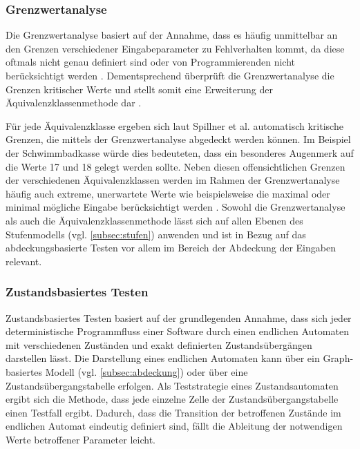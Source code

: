 \subsubsection{Grenzwertanalyse}

Die Grenzwertanalyse basiert auf der Annahme, dass es häufig unmittelbar an den Grenzen verschiedener Eingabeparameter zu Fehlverhalten kommt, da diese oftmals nicht genau definiert sind oder von Programmierenden nicht berücksichtigt werden \cite[S. 120]{spillner2011software}. Dementsprechend überprüft die Grenzwertanalyse die Grenzen kritischer Werte und stellt somit eine Erweiterung der Äquivalenzklassenmethode dar \cite[S. 120 f.]{spillner2011software}. 

Für jede Äquivalenzklasse ergeben sich laut Spillner et al. \cite[S. 120 f.]{spillner2011software} automatisch kritische Grenzen, die mittels der Grenzwertanalyse abgedeckt werden können. Im Beispiel der Schwimmbadkasse würde dies bedeuteten, dass ein besonderes Augenmerk auf die Werte 17 und 18 gelegt werden sollte. Neben diesen offensichtlichen Grenzen der verschiedenen Äquivalenzklassen werden im Rahmen der Grenzwertanalyse häufig auch extreme, unerwartete Werte wie beispielsweise die maximal oder minimal mögliche Eingabe berücksichtigt werden \cite[S. 122]{spillner2011software}. Sowohl die Grenzwertanalyse als auch die Äquivalenzklassenmethode lässt sich auf allen Ebenen des Stufenmodells (vgl. \autoref{subsec:stufen}) anwenden und ist in Bezug auf das abdeckungsbasierte Testen vor allem im Bereich der Abdeckung der Eingaben relevant.

\subsubsection{Zustandsbasiertes Testen}

Zustandsbasiertes Testen basiert auf der grundlegenden Annahme, dass sich jeder deterministische Programmfluss einer Software durch einen endlichen Automaten mit verschiedenen Zuständen und exakt definierten Zustandsübergängen darstellen lässt. Die Darstellung eines endlichen Automaten kann über ein Graph-basiertes Modell (vgl. \autoref{subsec:abdeckung}) oder über eine Zustandsübergangstabelle erfolgen. Als Teststrategie eines Zustandsautomaten ergibt sich die Methode, dass jede einzelne Zelle der Zustandsübergangstabelle einen Testfall ergibt. Dadurch, dass die Transition der betroffenen Zustände im endlichen Automat eindeutig definiert sind, fällt die Ableitung der notwendigen Werte betroffener Parameter leicht. 

